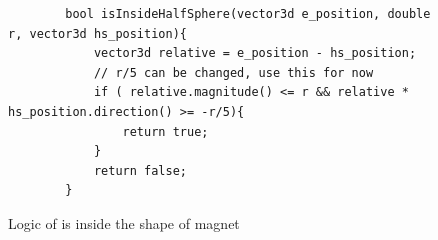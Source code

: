 \documentclass{book}
\begin{document}
\begin{figure}[H]
    \centering
    \captionsetup{justification=centering}
    \begin{verbatim}
        bool isInsideHalfSphere(vector3d e_position, double r, vector3d hs_position){
            vector3d relative = e_position - hs_position;       
            // r/5 can be changed, use this for now                                
            if ( relative.magnitude() <= r && relative * hs_position.direction() >= -r/5){      
                return true;                                                                 
            }
            return false;
        }
    \end{verbatim}
\caption{Logic of is \e inside the shape of magnet}
\label{fig:is_inside_halfsphere}
\end{figure}
\end{document}
